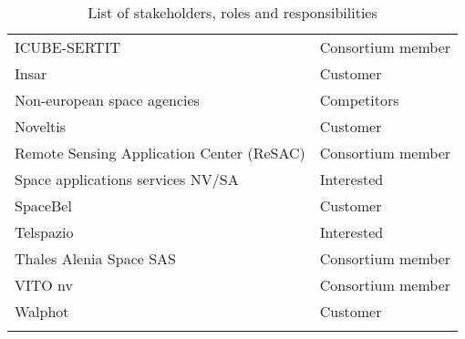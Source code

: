 \begin{center}
\begin{longtable}{ll}
ICUBE-SERTIT                        & Consortium member \\ 
Insar&Customer\\
Non-european space agencies&Competitors\\
Noveltis&Customer\\
Remote Sensing Application Center (ReSAC)                               & Consortium member \\
Space applications services NV/SA&Interested\\
SpaceBel&Customer\\
Telspazio&Interested\\
Thales Alenia Space SAS             & Consortium member                                                                       \\ 
VITO nv                             & Consortium member \\
Walphot&Customer\\

 \bottomrule[2pt]

\caption{List of stakeholders, roles and responsibilities}
\label{table_stakeholders}
\end{longtable}

\end{center}

